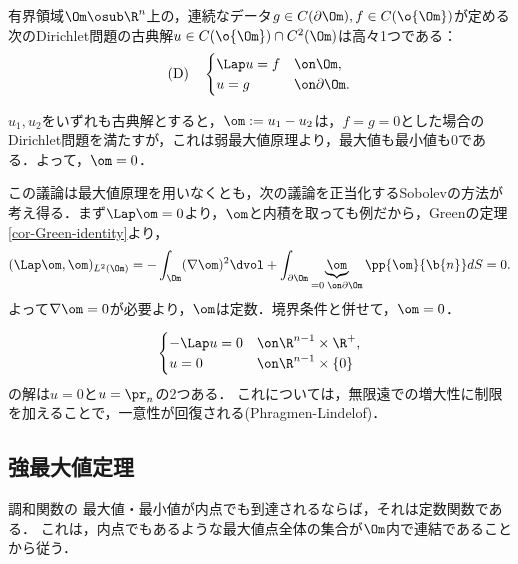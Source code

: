 \documentclass[uplatex,dvipdfmx]{jsreport}
\begin{document}
\begin{corollary}[Dirichlet問題の解の一意性]\label{cor-uniqueness-of-Dirichlet-problem-of-Laplace-eq}
    有界領域$\Om\osub\R^n$上の，連続なデータ$g\in C(\partial\Om),f\in C(\o{\Om})$が定める次のDirichlet問題の古典解$u\in C(\o{\Om})\cap C^2(\Om)$は高々1つである：
    \[\mathrm{(D)}\quad\begin{cases}
        \Lap u=f&\on \Om,\\
        u=g&\on \partial\Om.
    \end{cases}\]
\end{corollary}
\begin{Proof}
    $u_1,u_2$をいずれも古典解とすると，$\om:=u_1-u_2$は，$f=g=0$とした場合のDirichlet問題を満たすが，これは弱最大値原理より，最大値も最小値も$0$である．よって，$\om=0$．
\end{Proof}
\begin{remarks}
    この議論は最大値原理を用いなくとも，次の議論を正当化するSobolevの方法が考え得る．まず$\Lap\om=0$より，$\om$と内積を取っても例だから，Greenの定理\ref{cor-Green-identity}より，
    \[(\Lap\om,\om)_{L^2(\Om)}=-\int_\Om(\nabla\om)^2\dvol+\int_{\partial\Om}\underbrace{\om}_{=0\;\on\partial\Om}\pp{\om}{\b{n}}dS=0.\]
    よって$\nabla\om=0$が必要より，$\om$は定数．境界条件と併せて，$\om=0$．
\end{remarks}

\begin{remark}[領域の有界性は本質的な制約である]
    \[\begin{cases}
        -\Lap u=0&\on\R^{n-1}\times\R^+,\\
        u=0&\on\R^{n-1}\times\{0\}
    \end{cases}\]
    の解は$u=0$と$u=\pr_n$の2つある．
    これについては，無限遠での増大性に制限を加えることで，一意性が回復される(Phragmen-Lindelof)．
\end{remark}

\subsection{強最大値定理}

\begin{tcolorbox}[colframe=ForestGreen, colback=ForestGreen!10!white,breakable,colbacktitle=ForestGreen!40!white,coltitle=black,fonttitle=\bfseries\sffamily,
title=]
    調和関数の
    最大値・最小値が内点でも到達されるならば，それは定数関数である．
    これは，内点でもあるような最大値点全体の集合が$\Om$内で連結であることから従う．
\end{tcolorbox}
\end{document}

